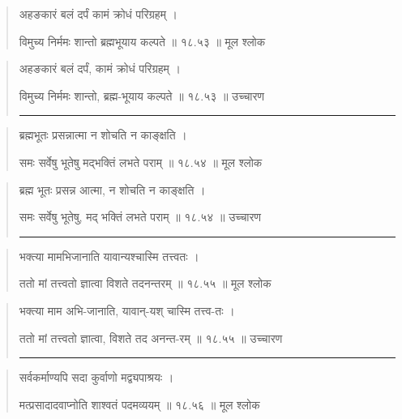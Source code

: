 \begin{quotation}

अहङकारं बलं दर्पं कामं क्रोधं परिग्रहम्‌ ।  

विमुच्य निर्ममः शान्तो ब्रह्मभूयाय कल्पते  ॥ १८.५३ ॥  मूल श्लोक
\end{quotation}

\begin{quotation}
अहङकारं बलं दर्पं, कामं क्रोधं परिग्रहम्‌ ।  

विमुच्य निर्ममः शान्तो, ब्रह्म-भूयाय कल्पते  ॥ १८.५३ ॥  उच्चारण

\noindent\rule{16cm}{0.4pt} 
\end{quotation}


\begin{quotation}

ब्रह्मभूतः प्रसन्नात्मा न शोचति न काङ्क्षति ।  

समः सर्वेषु भूतेषु मद्भक्तिं लभते पराम्‌  ॥ १८.५४ ॥  मूल श्लोक
\end{quotation}

\begin{quotation}

ब्रह्म भूतः प्रसन्न आत्मा, न शोचति न काङ्क्षति ।  

समः सर्वेषु भूतेषु, मद् भक्तिं लभते पराम्‌  ॥ १८.५४ ॥  उच्चारण

\noindent\rule{16cm}{0.4pt} 
\end{quotation}


\begin{quotation}

भक्त्या मामभिजानाति यावान्यश्चास्मि तत्त्वतः ।  

ततो मां तत्त्वतो ज्ञात्वा विशते तदनन्तरम्‌  ॥ १८.५५ ॥  मूल श्लोक
\end{quotation}

\begin{quotation}

भक्त्या माम अभि-जानाति, यावान्-यश् चास्मि तत्त्व-तः ।  

ततो मां तत्त्वतो ज्ञात्वा, विशते तद अनन्त-रम्‌  ॥ १८.५५ ॥  उच्चारण

\noindent\rule{16cm}{0.4pt} 
\end{quotation}


\begin{quotation}

सर्वकर्माण्यपि सदा कुर्वाणो मद्व्यपाश्रयः ।  

मत्प्रसादादवाप्नोति शाश्वतं पदमव्ययम्‌  ॥ १८.५६ ॥  मूल श्लोक
\end{quotation}

